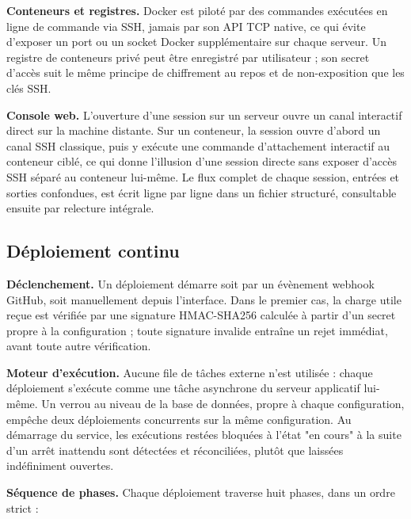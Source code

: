 \textbf{Conteneurs et registres.} Docker est piloté par des commandes
exécutées en ligne de commande via SSH, jamais par son API TCP native,
ce qui évite d'exposer un port ou un socket Docker supplémentaire sur
chaque serveur. Un registre de conteneurs privé peut être enregistré
par utilisateur ; son secret d'accès suit le même principe de
chiffrement au repos et de non-exposition que les clés SSH.

\textbf{Console web.} L'ouverture d'une session sur un serveur ouvre un
canal interactif direct sur la machine distante. Sur un conteneur, la
session ouvre d'abord un canal SSH classique, puis y exécute une
commande d'attachement interactif au conteneur ciblé, ce qui donne
l'illusion d'une session directe sans exposer d'accès SSH séparé au
conteneur lui-même. Le flux complet de chaque session, entrées et
sorties confondues, est écrit ligne par ligne dans un fichier structuré,
consultable ensuite par relecture intégrale.

\subsection{Déploiement continu}

\textbf{Déclenchement.} Un déploiement démarre soit par un évènement
webhook GitHub, soit manuellement depuis l'interface. Dans le premier
cas, la charge utile reçue est vérifiée par une signature HMAC-SHA256
calculée à partir d'un secret propre à la configuration ; toute
signature invalide entraîne un rejet immédiat, avant toute autre
vérification.

\textbf{Moteur d'exécution.} Aucune file de tâches externe n'est
utilisée : chaque déploiement s'exécute comme une tâche asynchrone du
serveur applicatif lui-même. Un verrou au niveau de la base de données,
propre à chaque configuration, empêche deux déploiements concurrents sur
la même configuration. Au démarrage du service, les exécutions restées
bloquées à l'état "en cours" à la suite d'un arrêt inattendu sont
détectées et réconciliées, plutôt que laissées indéfiniment ouvertes.

\textbf{Séquence de phases.} Chaque déploiement traverse huit phases,
dans un ordre strict :

